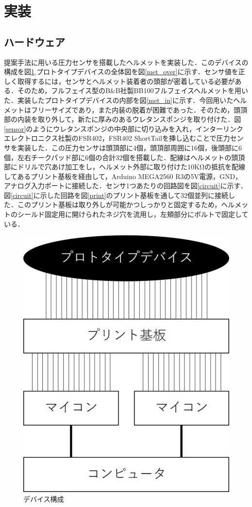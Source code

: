 \documentclass[Japanese,noauthor]{dicomopapers}
\begin{document}
\section{実装}
\label{make}
\subsection{ハードウェア}
提案手法に用いる圧力センサを搭載したヘルメットを実装した．このデバイスの構成を図\ref{device},プロトタイプデバイスの全体図を図\ref{met_over}に示す．センサ値を正しく取得するには，センサとヘルメット装着者の頭部が密着している必要がある．そのため，フルフェイス型のB\&B社製BB100フルフェイスヘルメットを用いた．実装したプロトタイプデバイスの内部を図\ref{met_in}に示す．今回用いたヘルメットはフリーサイズであり，また内装の脱着が困難であった．そのため，頭頂部の内装を取り外して，新たに厚みのあるウレタンスポンジを取り付けた．図\ref{sensor}のようにウレタンスポンジの中央部に切り込みを入れ，インターリンク エレクトロニクス社製のFSR402，FSR402 ShortTailを挿し込むことで圧力センサを実装した．この圧力センサは頭頂部に4個，頭頂部周囲に16個，後頭部に6個，左右チークパッド部に6個の合計32個を搭載した．配線はヘルメットの頭頂部にドリルで穴あけ加工をし，ヘルメット外部に取り付けた10KΩの抵抗を配線してあるプリント基板を経由して，Arduino MEGA2560 R3の5V電源，GND，アナログ入力ポートに接続した．センサ1つあたりの回路図を図\ref{circuit}に示す．図\ref{circuit}に示した回路を図\ref{print}のプリント基板を通して32個並列に接続した．このプリント基板は取り外しが可能かつしっかりと固定するため，ヘルメットのシールド固定用に開けられたネジ穴を流用し，左頬部分にボルトで固定している．

\begin{figure}[!t]
  \begin{center}
    \includegraphics[width=0.5\linewidth]{figure/device.eps}
  \end{center}
  \caption{デバイス構成}
  \label{device}
\end{figure}
\end{document}
